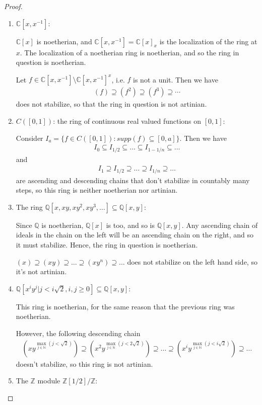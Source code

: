 \documentclass[12pt]{extarticle}
\newcommand{\set}[1]{\{#1\}}
\newcommand{\C}{\mathbb{C}}
\newcommand{\N}{\mathbb{N}}
\newcommand{\Q}{\mathbb{Q}}
\newcommand{\Z}{\mathbb{Z}}
\newcommand{\<}{\langle}
\renewcommand{\>}{\rangle}
\theoremstyle{definition}
\begin{document}
\begin{proof}
\begin{enumerate}
  \item
    $\C[x,x^{-1}]$:

    $\C[x]$ is noetherian, and $\C[x,x^{-1}] = \C[x]_x$ is the localization of the ring at $x$. The localization of a noetherian ring is noetherian, and so the ring in question is noetherian.

    Let $f \in \C[x,x^{-1}] \setminus \C[x,x^{-1}]^x$, i.e. $f$ is not a unit. Then we have
    \begin{align*}
      (f) \supseteq (f^2) \supseteq (f^3) \supseteq \cdots 
    \end{align*}
    does not stabilize, so that the ring in question is not artinian.
    
  \item
    $C([0,1])$: the ring of continuous real valued functions on $[0,1]$:

    Consider $I_a = \set{f \in C([0,1]): supp(f) \subseteq [0,a]}$. Then we have
    \begin{align*}
      I_{0} \subseteq I_{1/2} \subseteq \dots \subseteq I_{1-1/n} \subseteq \dots 
    \end{align*}
    and
    \begin{align*}
      I_{1} \supseteq I_{1/2} \supseteq \dots \supseteq I_{1/n} \supseteq \dots 
    \end{align*}
    are ascending and descending chains that don't stabilize in countably many steps, so this ring is neither noetherian nor artinian.

  \item
    The ring $\Q[x,xy,xy^2,xy^3,\dots] \subseteq \Q[x,y]$:

    Since $\Q$ is noetherian, $\Q[x]$ is too, and so is $\Q[x,y]$. Any ascending chain of ideals in the chain on the left will be an ascending chain on the right, and so it must stabilize. Hence, the ring in question is noetherian.

    $(x) \supseteq (xy) \supseteq \dots \supseteq (xy^n) \supseteq \dots $ does not stabilize on the left hand side, so it's not artinian.
  \item
    $\Q[x^iy^j|j<i\sqrt{2}, i,j \geq 0] \subseteq \Q[x,y]$:

    This ring is noetherian, for the same reason that the previous ring was noetherian.

    However, the following descending chain 
    \begin{align*}
      (xy^{\max\limits_{j \in \N}(j<\sqrt{2})}) \supseteq (x^2y^{\max\limits_{j \in \N}(j<2\sqrt{2})}) \supseteq \dots \supseteq (x^iy^{\max\limits_{j \in \N}(j<i\sqrt{2})}) \supseteq \dots
    \end{align*}
    doesn't stabilize, so this ring is not artinian. 
  \item
    The $\Z$ module $\Z[1/2]/\Z$:


\end{enumerate}
\end{proof}
\end{document}
